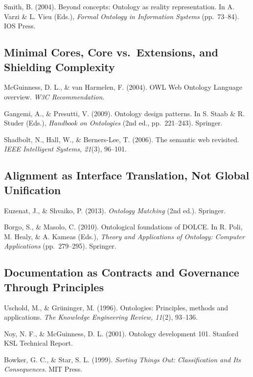 \documentclass[
  openright]{book}
\begin{document}
Smith, B. (2004). Beyond concepts: Ontology as reality representation.
In A. Varzi \& L. Vieu (Eds.), \emph{Formal Ontology in Information
Systems} (pp.~73--84). IOS Press.

\subsection{Minimal Cores, Core vs.~Extensions, and Shielding
Complexity}\label{minimal-cores-core-vs.-extensions-and-shielding-complexity}

McGuinness, D. L., \& van Harmelen, F. (2004). OWL Web Ontology Language
overview. \emph{W3C Recommendation}.

Gangemi, A., \& Presutti, V. (2009). Ontology design patterns. In S.
Staab \& R. Studer (Eds.), \emph{Handbook on Ontologies} (2nd ed.,
pp.~221--243). Springer.

Shadbolt, N., Hall, W., \& Berners-Lee, T. (2006). The semantic web
revisited. \emph{IEEE Intelligent Systems, 21}(3), 96--101.

\subsection{Alignment as Interface Translation, Not Global
Unification}\label{alignment-as-interface-translation-not-global-unification}

Euzenat, J., \& Shvaiko, P. (2013). \emph{Ontology Matching} (2nd ed.).
Springer.

Borgo, S., \& Masolo, C. (2010). Ontological foundations of DOLCE. In R.
Poli, M. Healy, \& A. Kameas (Eds.), \emph{Theory and Applications of
Ontology: Computer Applications} (pp.~279--295). Springer.

\subsection{Documentation as Contracts and Governance Through
Principles}\label{documentation-as-contracts-and-governance-through-principles}

Uschold, M., \& Grüninger, M. (1996). Ontologies: Principles, methods
and applications. \emph{The Knowledge Engineering Review, 11}(2),
93--136.

Noy, N. F., \& McGuinness, D. L. (2001). Ontology development 101.
Stanford KSL Technical Report.

Bowker, G. C., \& Star, S. L. (1999). \emph{Sorting Things Out:
Classification and Its Consequences}. MIT Press.
\end{document}
